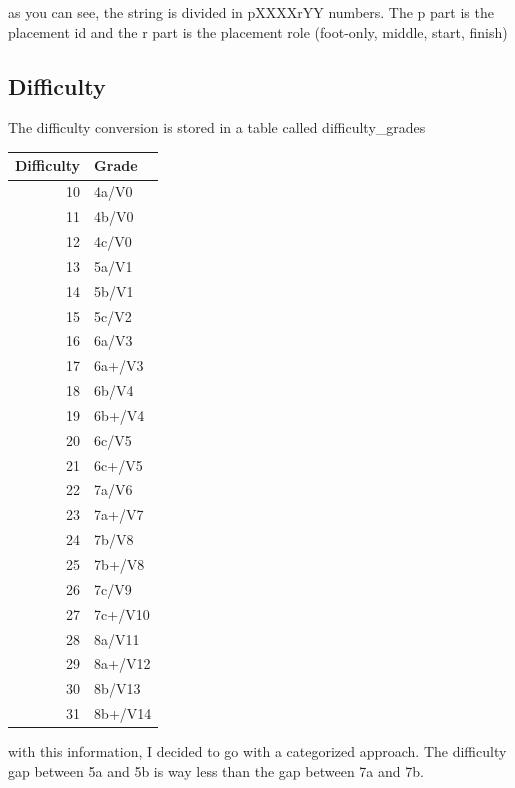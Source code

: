 \documentclass{article}
\begin{document}
as you can see, the string is divided in pXXXXrYY numbers. 
The p part is the placement id and the r part is the placement role (foot-only, middle, start, finish)

\subsection{Difficulty}

The difficulty conversion is stored in a table called difficulty\_grades

\begin{center}
 \begin{tabular}{@{}r l@{}} \toprule
    Difficulty & Grade \\
    \midrule
    10 & 4a/V0 \\
    11 & 4b/V0 \\
    12 & 4c/V0 \\    
    13 & 5a/V1 \\
    14 & 5b/V1 \\
    15 & 5c/V2 \\
    16 & 6a/V3 \\
    17 & 6a+/V3 \\
    18 & 6b/V4 \\
    19 & 6b+/V4 \\
    20 & 6c/V5 \\
    21 & 6c+/V5 \\
    22 & 7a/V6 \\
    23 & 7a+/V7 \\
    24 & 7b/V8 \\
    25 & 7b+/V8 \\
    26 & 7c/V9 \\
    27 & 7c+/V10 \\
    28 & 8a/V11 \\
    29 & 8a+/V12 \\
    30 & 8b/V13 \\
    31 & 8b+/V14 \\
    \bottomrule
 \end{tabular}
\end{center}

with this information, I decided to go with a categorized approach. The difficulty gap between 5a and 5b is way less than the gap between 7a and 7b.
\end{document}

